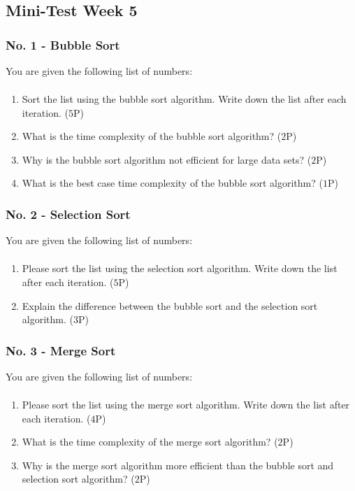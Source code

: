 \documentclass[10pt, oneside]{article}
\theoremstyle{remark}
\begin{document}
\subsection{Mini-Test Week 5}
\subsubsection{No. 1 - Bubble Sort}
You are given the following list of numbers: 
\begin{align*}
  [5, 3, 8, 2, 1, 4, 7, 6]
\end{align*}
\begin{enumerate}
  \item Sort the list using the bubble sort algorithm. Write down the list after each iteration. ($5$P)
  \item What is the time complexity of the bubble sort algorithm? ($2$P)
  \item Why is the bubble sort algorithm not efficient for large data sets? ($2$P)
  \item What is the best case time complexity of the bubble sort algorithm? ($1$P)
\end{enumerate}

\subsubsection{No. 2 - Selection Sort}
You are given the following list of numbers:
\begin{align*}
  [12, 3, 5, 7, 1, 9, 4, 6]
\end{align*}
\begin{enumerate}
  \item Please sort the list using the selection sort algorithm. Write down the list after each iteration. ($5$P)
  \item Explain the difference between the bubble sort and the selection sort algorithm. ($3$P)
\end{enumerate}

\subsubsection{No. 3 - Merge Sort}
You are given the following list of numbers:
\begin{align*}
  [8, 2, 4, 6, 3, 1, 5, 7]
\end{align*}
\begin{enumerate}
  \item Please sort the list using the merge sort algorithm. Write down the list after each iteration. ($4$P)
  \item What is the time complexity of the merge sort algorithm? ($2$P)
  \item Why is the merge sort algorithm more efficient than the bubble sort and selection sort algorithm? ($2$P)
\end{enumerate}
\end{document}
